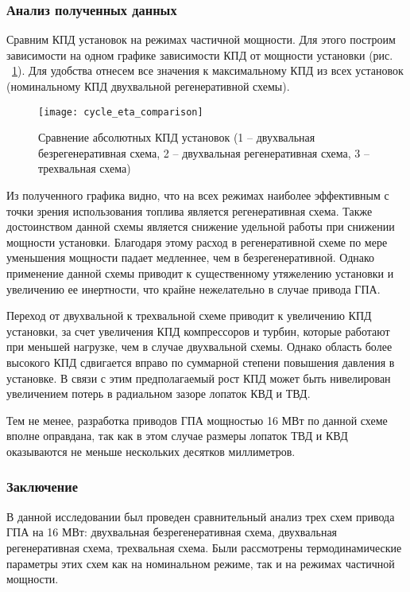 \subsubsection{Анализ полученных данных}
Сравним КПД установок на режимах частичной мощности. Для этого построим зависимости на одном графике зависимости КПД от мощности установки (рис. ~\ref{img:cycle_eta_comparison}). Для удобства отнесем все значения к максимальному КПД из всех установок (номинальному КПД двухвальной регенеративной схемы).

\begin{figure}[H]
    \centering
    \texttt{[image: cycle\_eta\_comparison]}
    \caption{Сравнение абсолютных КПД установок (1 – двухвальная безрегенеративная схема, 2 – двухвальная регенеративная схема, 3 – трехвальная схема)}
    \label{img:cycle_eta_comparison}
\end{figure}

Из полученного графика видно, что на всех режимах наиболее эффективным с точки зрения использования топлива является регенеративная схема. Также достоинством данной схемы является снижение удельной работы при снижении мощности установки. Благодаря этому расход в регенеративной схеме по мере уменьшения мощности падает медленнее, чем в безрегенеративной. Однако применение данной схемы приводит к существенному утяжелению установки и увеличению ее инертности, что крайне нежелательно в случае привода ГПА. 

Переход от двухвальной к трехвальной схеме приводит к увеличению КПД установки, за счет увеличения КПД компрессоров и турбин, которые работают при меньшей нагрузке, чем в случае двухвальной схемы. Однако область более высокого КПД сдвигается вправо по суммарной степени повышения давления в установке. В связи с этим предполагаемый рост КПД может быть нивелирован увеличением потерь в радиальном зазоре лопаток КВД и ТВД.

Тем не менее, разработка приводов ГПА мощностью 16 МВт по данной схеме вполне оправдана, так как в этом случае размеры лопаток ТВД и КВД оказываются не меньше нескольких десятков миллиметров.


\subsubsection{Заключение}

В данной исследовании был проведен сравнительный анализ трех схем привода ГПА на 16 МВт: двухвальная безрегенеративная схема, двухвальная регенеративная схема, трехвальная схема. Были рассмотрены термодинамические параметры этих схем как на номинальном режиме, так и на режимах частичной мощности.

